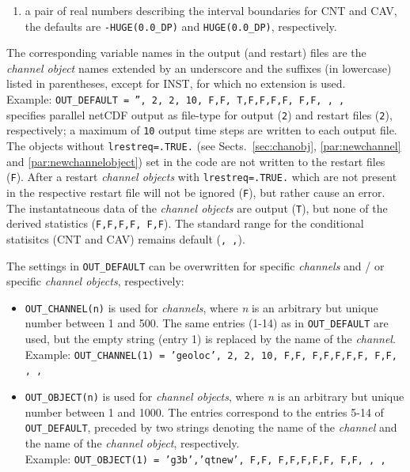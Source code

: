 \documentclass[twoside]{article}
\begin{document}
{\begin{itemize}
\begin{enumerate}
              being within a specific range
              between two subsequent output time steps (CAV),
        \item a pair of real numbers describing the interval boundaries
              for CNT and CAV, the defaults are
              {\tt -HUGE(0.0\_DP)} and {\tt HUGE(0.0\_DP)}, respectively.
       \end{enumerate}
       The corresponding variable names in the output (and restart) files
       are the {\it channel object} names extended by an underscore and the
       suffixes (in lowercase) listed in parentheses, except for INST,
       for which no extension is used.\\
       Example: {\tt OUT\_DEFAULT = '', 2, 2, 10, F,F, T,F,F,F,F, F,F, , ,}\\
       specifies parallel netCDF output as file-type for output ({\tt 2}) and
       restart files ({\tt 2}), respectively; a maximum of {\tt 10} output
       time steps are written to each output file. The objects without
       {\tt lrestreq=.TRUE.} (see Sects.~\ref{sec:chanobj},
       \ref{par:newchannel} and \ref{par:newchannelobject}) set in the code
       are not written to the restart files ({\tt F}). After a restart
       {\it channel objects} with {\tt lrestreq=.TRUE.} which are not present
       in the respective restart file will not be ignored ({\tt F}), but
       rather cause an error. The instantatneous data of the
       {\it channel objects} are output ({\tt T}), but none of the
       derived statistics ({\tt F,F,F,F, F,F}). The standard range for the
       conditional statisitcs (CNT and CAV) remains default ({\tt  , ,}).
\end{itemize}

The settings in {\tt OUT\_DEFAULT} can be overwritten for specific
{\it channels} and / or specific {\it channel objects}, respectively:
\begin{itemize}
 \item {\tt OUT\_CHANNEL(n)} is used for {\it channels}, where
       {\it n} is an arbitrary but unique number between 1 and 500.
       The same entries (1-14) as in {\tt OUT\_DEFAULT} are used, but
       the empty string (entry 1) is replaced by the name of the
       {\it channel}.\\
       Example: {\tt OUT\_CHANNEL(1) = 'geoloc', 2, 2, 10, F,F, F,F,F,F,F, F,F, , ,}
 \item {\tt OUT\_OBJECT(n)} is used for {\it channel objects}, where
       {\it n} is an arbitrary but unique number between 1 and 1000.
       The entries correspond to the entries 5-14 of {\tt OUT\_DEFAULT},
       preceded by two strings denoting the name of the {\it channel} and the
       name of the {\it channel object}, respectively.\\
       Example: {\tt OUT\_OBJECT(1) = 'g3b','qtnew', F,F, F,F,F,F,F, F,F, , ,}
\end{itemize}

}
\end{document}
